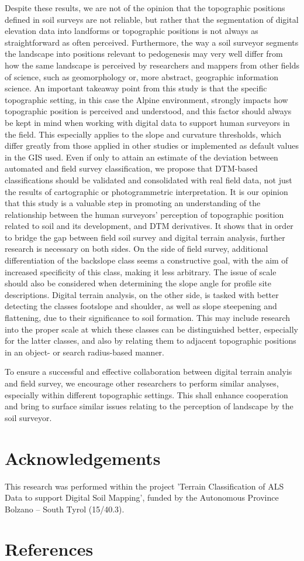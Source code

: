\documentclass[preprint,12pt,authoryear]{elsarticle}
\begin{document}
Despite these results, we are not of the opinion that the topographic positions defined in  soil surveys are not reliable, but rather that the segmentation of digital elevation data into landforms or topographic positions is not always as straightforward as often perceived. Furthermore, the way a soil surveyor segments the landscape into positions relevant to pedogenesis may very well differ from how the same landscape is perceived by researchers and mappers from other fields of science, such as geomorphology or, more abstract, geographic information science. An important takeaway point from this study is that the specific topographic setting, in this case the Alpine environment, strongly impacts how topographic position is perceived and understood, and this factor should always be kept in mind when working with digital data to support human surveyors in the field. This especially applies to the slope and curvature thresholds, which differ greatly from those applied in other studies or implemented as default values in the GIS used. Even if only to attain an estimate of the deviation between automated and field survey classification, we propose that DTM-based classifications should be validated and consolidated with real field data, not just the results of cartographic or photogrammetric interpretation. It is our opinion that this study is a valuable step in promoting an understanding of the relationship between the human surveyors' perception of topographic position related to soil and its development, and DTM derivatives.
It shows that in order to bridge the gap between field soil survey and digital terrain analysis, further research is necessary on both sides. On the side of field survey, additional differentiation of the backslope class seems a constructive goal, with the aim of increased specificity of this class, making it less arbitrary. The issue of scale should also be considered when determining the slope angle for profile site descriptions. Digital terrain analysis, on the other side, is tasked with better detecting the classes footslope and shoulder, as well as slope steepening and flattening, due to their significance to soil formation. This may include research into the proper scale at which these classes can be distinguished better, especially for the latter classes, and also by relating them to adjacent topographic positions in an object- or search radius-based manner.

To ensure a successful and effective collaboration between digital terrain analyis and field survey, we encourage other researchers to perform similar analyses, especially within different topographic settings. This shall enhance cooperation and bring to surface similar issues relating to the perception of landscape by the soil surveyor.

\section*{Acknowledgements} This research was performed within the project 'Terrain Classification of ALS Data to support Digital Soil Mapping', funded by the Autonomous Province Bolzano -- South Tyrol (15/40.3).
\section*{References}

\end{document}
